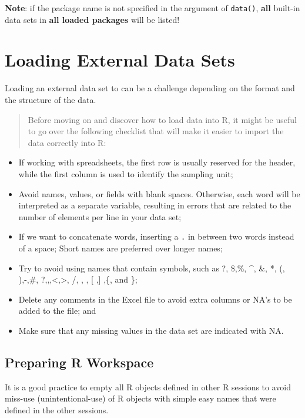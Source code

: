 \documentclass[
]{book}
\begin{document}
\textbf{Note}: if the package name is not specified in the argument of \texttt{data()}, \textbf{all} built-in data sets in \textbf{all loaded packages} will be listed!

\hypertarget{loading-external-data-sets}{%
\section{Loading External Data Sets}\label{loading-external-data-sets}}

Loading an external data set to can be a challenge depending on the format and the structure of the data.

\begin{quote}
Before moving on and discover how to load data into R, it might be useful to go over the following checklist that will make it easier to import the data correctly into R:
\end{quote}

\begin{itemize}
\item
  If working with spreadsheets, the first row is usually reserved for the header, while the first column is used to identify the sampling unit;
\item
  Avoid names, values, or fields with blank spaces. Otherwise, each word will be interpreted as a separate variable, resulting in errors that are related to the number of elements per line in your data set;
\item
  If we want to concatenate words, inserting a \texttt{.} in between two words instead of a space;
  Short names are preferred over longer names;
\item
  Try to avoid using names that contain symbols, such as ?, \$,\%, \^{}, \&, *, (, ),-,\#, ?,,,\textless,\textgreater, /, \textbar, , {[} ,{]} ,\{, and \};
\item
  Delete any comments in the Excel file to avoid extra columns or NA's to be added to the file; and
\item
  Make sure that any missing values in the data set are indicated with NA.
\end{itemize}

\hypertarget{preparing-r-workspace}{%
\subsection{Preparing R Workspace}\label{preparing-r-workspace}}

It is a good practice to empty all R objects defined in other R sessions to avoid miss-use (unintentional-use) of R objects with simple easy names that were defined in the other sessions.
\end{document}
